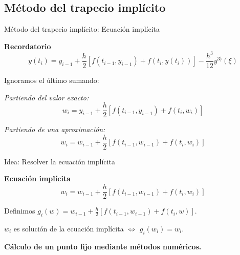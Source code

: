 	\subsection{Método del trapecio implícito}
		
		\begin{frame}{Método del trapecio implícito: Ecuación implícita}

			\begin{tcolorbox}[colback=ChetwodeBlue!10,colframe=ChetwodeBlue!60]
				\centering
				\textbf{Recordatorio}
				\begin{equation*} 
				y(t_{i}) = y_{i-1} + \frac{h}{2} \left[f(t_{i-1},y_{i-1}) + f(t_i, y(t_i))\right] - \frac{h^3}{12}y^{3)}(\xi)
				\end{equation*}
			\end{tcolorbox}
			
			Ignoramos el último sumando:

			\begin{tcolorbox}[colback=ChetwodeBlue!10,colframe=ChetwodeBlue!60]
				\textit{Partiendo del valor exacto:}
				\begin{equation} \label{eq:ecuacion-implicita1}
					w_i = y_{i-1} + \frac{h}{2} \left[f(t_{i-1},y_{i-1}) + f(t_i, w_i)\right]
				\end{equation}

				
				\textit{Partiendo de una aproximación:}
				\begin{equation} \label{eq:ecuacion-implicita2}
					w_i = w_{i-1} + \frac{h}{2} \left[f(t_{i-1},w_{i-1}) + f(t_i, w_i)\right]
				\end{equation}
			\end{tcolorbox}
		\end{frame}
		

		\begin{frame}{Idea: Resolver la ecuación implícita}
			\begin{tcolorbox}[colback=ChetwodeBlue!10,colframe=ChetwodeBlue!60]
				\centering
				\textbf{Ecuación implícita}
				\begin{equation*}
					w_i = w_{i-1} + \frac{h}{2} \left[f(t_{i-1},w_{i-1}) + f(t_i, w_i)\right]
				\end{equation*}
			\end{tcolorbox}

			\kern2mm
			Definimos $g_i(w) = w_{i-1} + \frac{h}{2} \left[f(t_{i-1},w_{i-1}) + f(t_i, w)\right]$. 

			\kern2mm
			\begin{note}
				$w_i$ es solución de la ecuación implícita $\iff$ $g_i(w_i) = w_i$. 
			\end{note}

			\color{ChetwodeBlue}\large\textbf{Cálculo de un punto fijo mediante métodos numéricos.}

		\end{frame}
		
